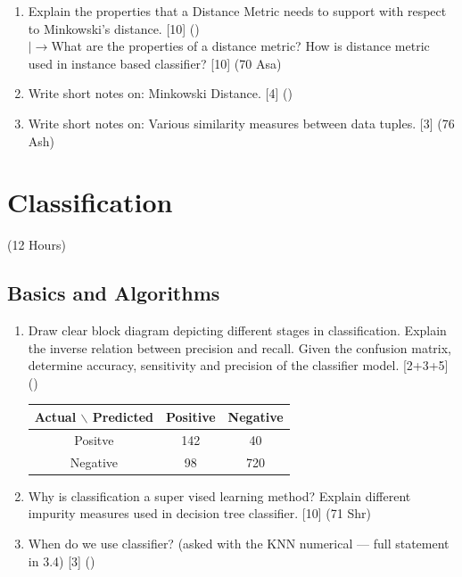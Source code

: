 \documentclass[12pt]{article}
\newcommand{\lb}{\\$\left|\rightarrow\right.$}
\begin{document}
\begin{enumerate}[topsep=0pt, noitemsep]
      \item Explain the properties that a Distance Metric needs to support with respect to Minkowski's distance. \hfill [10] ()
        \lb What are the properties of a distance metric? How is distance metric used in instance based classifier? \hfill [10] (70 Asa)

      \item Write short notes on: Minkowski Distance. \hfill [4] ()

      \item Write short notes on: Various similarity measures between data tuples. \hfill [3] (76 Ash)
    \end{enumerate}

\pagebreak
\section{Classification}
\begin{center}(12 Hours)\end{center}

  \subsection{Basics and Algorithms}
    \begin{enumerate}[topsep=0pt, noitemsep]
      \item Draw clear block diagram depicting different stages in classification. Explain the inverse relation between precision and recall. Given the confusion matrix, determine accuracy, sensitivity and precision of the classifier model. \hfill [2+3+5] ()\\
        \small
        \begin{tabular}{|c|c|c|}
          \hline
          Actual $\backslash$ Predicted & Positive & Negative \\ \hline
          Positve & 142 & 40 \\ \hline
          Negative & 98 & 720 \\ \hline
        \end{tabular}
        \normalsize

      \item Why is classification a super vised learning method? Explain different impurity measures used in decision tree classifier. \hfill [10] (71 Shr)

      \item When do we use classifier? (asked with the KNN numerical --- full statement in 3.4) \hfill [3] ()
    \end{enumerate}
\end{document}
